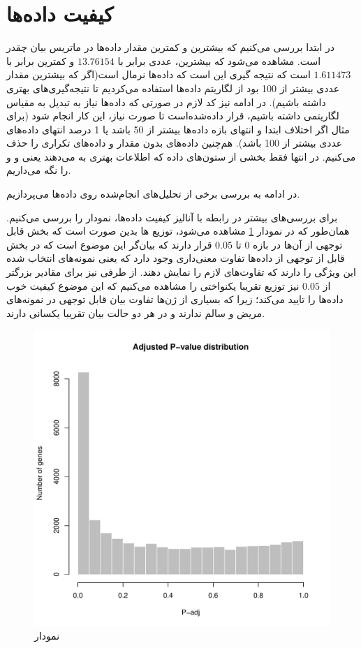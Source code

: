 \documentclass{article}
\begin{document}
\section{کیفیت داده‌ها}
در ابتدا بررسی می‌کنیم که بیشترین و کمترین مقدار داده‌ها در ماتریس بیان چقدر است. مشاهده می‌شود که بیشترین، عددی برابر با
$13.76154$
و کمترین برابر با
$1.611473$
است که نتیجه گیری این است که داده‌ها نرمال است(اگر که بیشترین مقدار عددی بیشتر از 100 بود از لگاریتم داده‌ها استفاده می‌کردیم تا نتیجه‌گیری‌های بهتری داشته باشیم). در ادامه نیز کد لازم در صورتی که داده‌ها نیاز به تبدیل به مقیاس لگاریتمی داشته باشیم، قرار داده‌شده‌است  تا صورت نیاز، این کار انجام شود (برای مثال اگر اختلاف ابتدا و انتهای بازه داده‌ها بیشتر از 50 باشد یا 1 درصد انتهای داده‌های عددی بیشتر از 100 باشد).
هم‌چنین داده‌های بدون مقدار و داده‌های تکراری را حذف می‌کنیم.
در انتها فقط بخشی از ستون‌های داده که اطلاعات بهتری به می‌دهند یعنی  و  و  را نگه ‌می‌داریم.

در ادامه به بررسی برخی از تحلیل‌های انجام‌شده روی داده‌‌ها می‌پردازیم.

برای بررسی‌های بیشتر در رابطه با آنالیز کیفیت داده‌ها، نمودار
را بررسی می‌کنیم. همان‌طور که در نمودار \ref{fig:adj-pv-dist} مشاهده می‌شود،  توزیع 
ها بدین صورت است که بخش قابل توجهی از آن‌ها در بازه $0$ تا $0.05$ قرار دارند که بیان‌گر این موضوع است که در بخش قابل از توجهی از داده‌ها تفاوت معنی‌داری وجود دارد  که یعنی نمونه‌های انتخاب شده این ویژگی را دارند که تفاوت‌های لازم را نمایش دهند. از طرفی نیز برای مقادیر بزرگتر‌ از 
$ 0.05$ 
نیز توزیع تقریبا یکنواختی را مشاهده می‌کنیم که این موضوع کیفیت خوب داده‌ها را تایید می‌کند؛ زیرا که بسیاری از ژن‌ها تفاوت بیان قابل توجهی در نمونه‌های مریض و سالم ندارند و در هر دو حالت بیان تقریبا یکسانی دارند.

\begin{figure}[h!]
	\centering
	\includegraphics[width=0.5\columnwidth]{figs/adj-pv-dist.pdf}
	\caption{نمودار }
	\label{fig:adj-pv-dist}
\end{figure}
\end{document}
